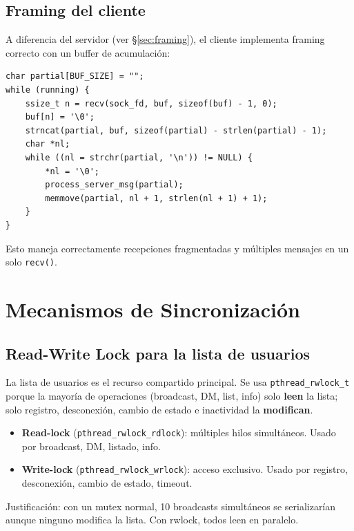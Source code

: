 \documentclass[12pt,a4paper]{article}
\begin{document}
\subsection{Framing del cliente}

A diferencia del servidor (ver \S\ref{sec:framing}), el cliente implementa framing
correcto con un buffer de acumulación:

\begin{lstlisting}[caption={Buffer de acumulación en recv\_thread}]
char partial[BUF_SIZE] = "";
while (running) {
    ssize_t n = recv(sock_fd, buf, sizeof(buf) - 1, 0);
    buf[n] = '\0';
    strncat(partial, buf, sizeof(partial) - strlen(partial) - 1);
    char *nl;
    while ((nl = strchr(partial, '\n')) != NULL) {
        *nl = '\0';
        process_server_msg(partial);
        memmove(partial, nl + 1, strlen(nl + 1) + 1);
    }
}
\end{lstlisting}

Esto maneja correctamente recepciones fragmentadas y múltiples mensajes en un solo
\texttt{recv()}.

\section{Mecanismos de Sincronización}
\label{sec:sync}

\subsection{Read-Write Lock para la lista de usuarios}

La lista de usuarios es el recurso compartido principal.  Se usa
\texttt{pthread\_rwlock\_t} porque la mayoría de operaciones (broadcast, DM, list,
info) solo \textbf{leen} la lista; solo registro, desconexión, cambio de estado e
inactividad la \textbf{modifican}.

\begin{itemize}[nosep]
    \item \textbf{Read-lock} (\texttt{pthread\_rwlock\_rdlock}): múltiples hilos
          simultáneos.  Usado por broadcast, DM, listado, info.
    \item \textbf{Write-lock} (\texttt{pthread\_rwlock\_wrlock}): acceso exclusivo.
          Usado por registro, desconexión, cambio de estado, timeout.
\end{itemize}

Justificación: con un mutex normal, 10 broadcasts simultáneos se serializarían
aunque ninguno modifica la lista.  Con rwlock, todos leen en paralelo.
\end{document}
